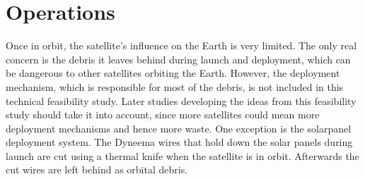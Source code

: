 \section{Operations}
\label{SSOPE}

Once in orbit, the satellite's influence on the Earth is very limited. The only real concern is the debris it leaves behind during launch and deployment, which can be dangerous to other satellites orbiting the Earth.
However, the deployment mechanism, which is responsible for most of the debris, is not included in this technical feasibility study. Later studies developing the ideas from this feasibility study should take it into account, since more satellites could mean more deployment mechanisms and hence more waste. One exception is the solarpanel deployment system. The Dyneema wires that hold down the solar panels during launch are cut using a thermal knife when the satellite is in orbit. Afterwards the cut wires are left behind as orbital debris.